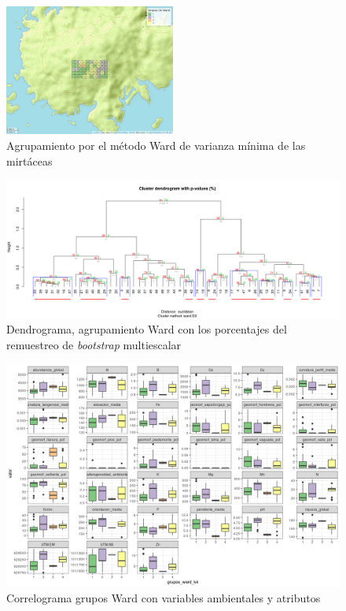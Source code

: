 \documentclass[11pt,]{article}
\begin{document}
\begin{figure}
\centering
\includegraphics[width=0.50000\textwidth]{mapa_ward_k4.png}
\caption{Agrupamiento por el método Ward de varianza mínima de las
mirtáceas \label{fig:mapa_ward}}
\end{figure}

\begin{figure}
\centering
\includegraphics{bootstrap_Ward.png}
\caption{Dendrograma, agrupamiento Ward con los porcentajes del
remuestreo de \emph{bootstrap} multiescalar
\label{fig:*bootstrap*_multiescalar}}
\end{figure}

\begin{figure}
\centering
\includegraphics{correlograma_wardyvariablesambientales.png}
\caption{Correlograma grupos Ward con variables ambientales y atributos
\label{fig:ward_con_variables}}
\end{figure}
\end{document}
